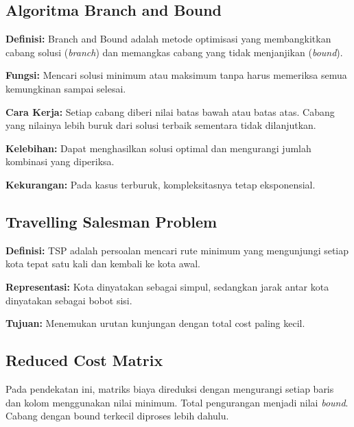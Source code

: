 \subsection{Algoritma Branch and Bound}
\textbf{Definisi:} Branch and Bound adalah metode optimisasi yang membangkitkan cabang solusi (\textit{branch}) dan memangkas cabang yang tidak menjanjikan (\textit{bound}).

\textbf{Fungsi:} Mencari solusi minimum atau maksimum tanpa harus memeriksa semua kemungkinan sampai selesai.

\textbf{Cara Kerja:} Setiap cabang diberi nilai batas bawah atau batas atas. Cabang yang nilainya lebih buruk dari solusi terbaik sementara tidak dilanjutkan.

\textbf{Kelebihan:} Dapat menghasilkan solusi optimal dan mengurangi jumlah kombinasi yang diperiksa.

\textbf{Kekurangan:} Pada kasus terburuk, kompleksitasnya tetap eksponensial.

\subsection{Travelling Salesman Problem}
\textbf{Definisi:} TSP adalah persoalan mencari rute minimum yang mengunjungi setiap kota tepat satu kali dan kembali ke kota awal.

\textbf{Representasi:} Kota dinyatakan sebagai simpul, sedangkan jarak antar kota dinyatakan sebagai bobot sisi.

\textbf{Tujuan:} Menemukan urutan kunjungan dengan total cost paling kecil.

\subsection{Reduced Cost Matrix}
Pada pendekatan ini, matriks biaya direduksi dengan mengurangi setiap baris dan kolom menggunakan nilai minimum. Total pengurangan menjadi nilai \textit{bound}. Cabang dengan bound terkecil diproses lebih dahulu.
